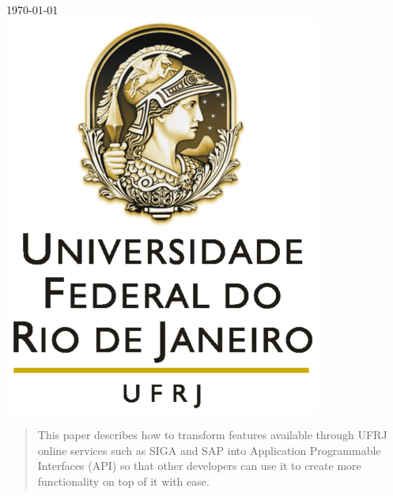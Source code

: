 \begin{titlepage}

{\large \today}\\[2cm] %


\includegraphics{logo.png}\\[1cm] %
 

\vfill %

\end{titlepage}


\begin{abstract}
This paper describes how to transform features available through UFRJ online services such as SIGA and SAP into Application Programmable Interfaces (API) so that other developers can use it to create more functionality on top of it with ease.
\end{abstract}

